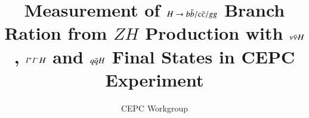 \documentclass[coverpage]{cepcnote}
\title{Measurement of $H\rightarrow b\bar{b} /c\bar{c} /gg$ Branch Ration from $ZH$ Production with  $\nu \bar{\nu} H$, $l^{+}l^{-}H$ and $q\bar{q}H$  Final States in CEPC Experiment}
\author{CEPC Workgroup}
\begin{document}
\linenumbers
\tableofcontents
\clearpage









\clearpage
\pagebreak
\newpage

%



\end{document}
